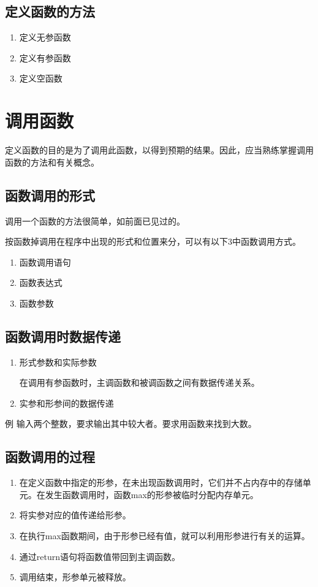 \subsection{定义函数的方法}
\begin{enumerate}
	\item 定义无参函数
	\item 定义有参函数
	\item 定义空函数
\end{enumerate}
\section{调用函数}
定义函数的目的是为了调用此函数，以得到预期的结果。因此，应当熟练掌握调用函数的方法和有关概念。
\subsection{函数调用的形式}
调用一个函数的方法很简单，如前面已见过的。

按函数掉调用在程序中出现的形式和位置来分，可以有以下3中函数调用方式。
\begin{enumerate}
	\item 函数调用语句
	\item 函数表达式
	\item 函数参数
\end{enumerate}
\subsection{函数调用时数据传递}
\begin{enumerate}
	\item 形式参数和实际参数

		在调用有参函数时，主调函数和被调函数之间有数据传递关系。
	\item 实参和形参间的数据传递
\end{enumerate}

例 输入两个整数，要求输出其中较大者。要求用函数来找到大数。
\subsection{函数调用的过程}
\begin{enumerate}
	\item 在定义函数中指定的形参，在未出现函数调用时，它们并不占内存中的存储单元。在发生函数调用时，函数max的形参被临时分配内存单元。
	\item 将实参对应的值传递给形参。
	\item 在执行max函数期间，由于形参已经有值，就可以利用形参进行有关的运算。
	\item 通过return语句将函数值带回到主调函数。
	\item 调用结束，形参单元被释放。
\end{enumerate}
